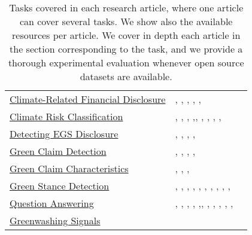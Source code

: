 \begin{table}[H]
\begin{tabular}{p{5cm}|p{3cm}|p{7cm}}
    \hyperref[sec: tcfd]{Climate-Related Financial Disclosure} &   \cite{dingCarbonEmissionsTCFD2023}, \cite{auzepy_evaluating_2023}, \cite{bjarne_brie_mandatory_2022}, \cite{bingler_cheap_2021}, \cite{sampson_tcfd-nlp_nodate}, \cite{bingler2023cheaptalkspecificitysentiment}  &  \\
   \hyperref[sec: climate risk]{Climate Risk Classification} &  \cite{liCorporateClimateRisk2020}, \cite{kheradmand2021a}, \cite{chou_ESG}, \cite{SAUTNER_cliamte_change_exp},\cite{marco_polignano_nlp_2022}, \cite{hyewon_kang_analyzing_2022},  \cite{kolbel_ask_2021}, \cite{Friederich_climate_risk_disclosure}, \cite{bingler2023cheaptalkspecificitysentiment}, \cite{xiang_dare_2023} \cite{nicolas_webersinke_climatebert_2021}  \\
    \hyperref[sec:esg]{Detecting EGS Disclosure} &  \cite{rouenEvolutionESGReports2023}, \cite{Mehra_2022}, \cite{schimanski_bridging_2023}, \cite{LEE2023119726}, \cite{huangFinBERTLargeLanguage2020}\\
    \hyperref[sec:green claim]{Green Claim Detection} & \cite{panchendrarajan2024claim}, \cite{vinicius_woloszyn_towards_2021}, \cite{stammbach_environmental_2023}, \cite{linSUSTAINABLESIGNALSijcai2023},  \cite{Arslan_Hassan_Li_Tremayne_2020}\\
   \hyperref[sec: claim characteristics]{Green Claim Characteristics} & \cite{bingler2023cheaptalkspecificitysentiment}, \cite{schimanski_bridging_2023}, \cite{tobias_schimanski_climatebert-netzero_2023}, \cite{vinicius_woloszyn_towards_2021} \\
   \hyperref[sec:stance detection]{Green Stance Detection}&  \cite{diggelmann_climate-fever_2020}, \cite{Wang2021EvidenceBA}, \cite{morio2023an}, \cite{luo_detecting_2020}, \cite{vaid-etal-2022-towards}, \cite{lai_using_2023}, \cite{vaghefi2022deep}, \cite{xiang_dare_2023}, \cite{nicolas_webersinke_climatebert_2021}, \cite{spokoyny2023answering}, \cite{luo_detecting_2020} \\
  \hyperref[sec:qa]{Question Answering} &  \cite{luccioni_analyzing_2020}, \cite{coanComputerassistedClassificationContrarian2021}, \cite{cliamtebot_2022}, \cite{cliamtebot_2022}, \cite{cliamtebot_2022},\cite{spokoyny2023answering}, \cite{jingwei_ni_paradigm_2023}, \cite{s_vaghefi_chatclimate_2023}, \cite{mullappilly-etal-2023-arabic}, \cite{mullappilly-etal-2023-arabic}, \cite{spokoyny2023answering}, \cite{thulke2024climategpt}  \\ 
  \hyperref[sec: greenwashing signals]{Greenwashing Signals} & \\
  \hline
    \end{tabular}

    \caption{Tasks covered in each research article, where one article can cover several tasks. We show also the available resources per article. We cover in depth each article in the section corresponding to the task, and we provide a thorough experimental evaluation whenever open source datasets are available. }
    \label{tab:overview_papers}
\end{table}